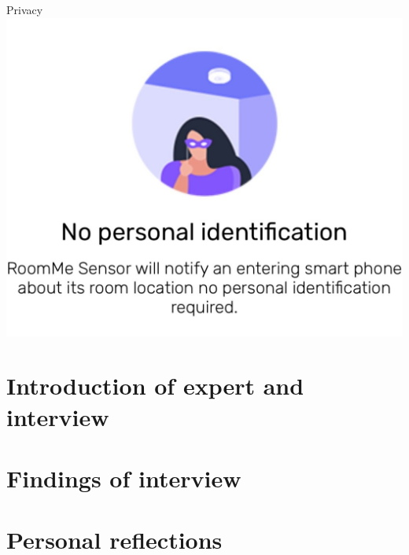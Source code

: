 \documentclass[10pt]{beamer}
\begin{document}
\begin{frame}{Privacy}
	\vspace{-4mm}
	\includegraphics[width=\textwidth]{images/roomme/3.png}
\end{frame}

\section{Introduction of expert and interview}





\section{Findings of interview}





\section{Personal reflections}




  

\end{document}
